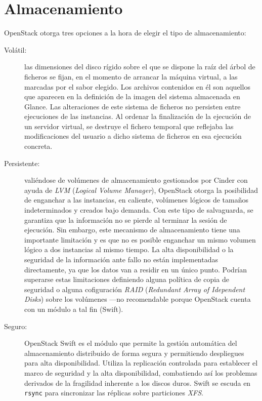 \section{Almacenamiento}\label{sec:almacenamiento}
\noindent OpenStack otorga tres opciones a la hora de elegir el tipo de almacenamiento:
\begin{description}
 \item[Vol\'atil:] las dimensiones del disco r\'igido sobre el que se dispone la ra\'iz del \'arbol de ficheros se fijan, en el momento de arrancar la m\'aquina virtual, a las marcadas por el sabor elegido. Los archivos contenidos en \'el son aquellos que aparecen en la definici\'on de la imagen del sistema almacenada en Glance. Las alteraciones de este sistema de ficheros no persisten entre ejecuciones de las instancias. Al ordenar la finalizaci\'on de la ejecuci\'on de un servidor virtual, se destruye el fichero temporal que reflejaba las modificaciones del usuario a dicho sistema de ficheros en esa ejecuci\'on concreta.
 \item[Persistente:] vali\'endose de vol\'umenes de almacenamiento gestionados por Cinder con ayuda de \emph{LVM} (\emph{Logical Volume Manager}), OpenStack otorga la posibilidad de enganchar a las instancias, en caliente, vol\'umenes l\'ogicos de tama\~nos indeterminados y creados bajo demanda. Con este tipo de salvaguarda, se garantiza que la informaci\'on no se pierde al terminar la sesi\'on de ejecuci\'on. Sin embargo, este mecanismo de almacenamiento tiene una importante limitaci\'on y es que no es posible enganchar un mismo volumen l\'ogico a dos instancias al mismo tiempo. La alta disponibilidad o la seguridad de la informaci\'on ante fallo no est\'an implementadas directamente, ya que los datos van a residir en un \'unico punto. Podr\'ian superarse estas limitaciones definiendo alguna pol\'itica de copia de seguridad o alguna cofiguraci\'on \emph{RAID} (\emph{Redundant Array of Idependent Disks}) sobre los vol\'umenes ---no recomendable porque OpenStack cuenta con un m\'odulo a tal fin (Swift).
 \item[Seguro:] OpenStack Swift es el m\'odulo que permite la gesti\'on autom\'atica del almacenamiento distribuido de forma segura y permitiendo despliegues para alta disponibilidad. Utiliza la replicaci\'on controlada para establecer el marco de seguridad y la alta disponibilidad, combatiendo as\'i los problemas derivados de la fragilidad inherente a los discos duros. Swift se escuda en \texttt{rsync} para sincronizar las r\'eplicas sobre particiones \emph{XFS}.
\end{description}


